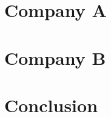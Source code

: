 \documentclass[a4paper,12pt]{report}
\begin{document}
\section{Company A}



\section{Company B}



\section{Conclusion}

\end{document}
